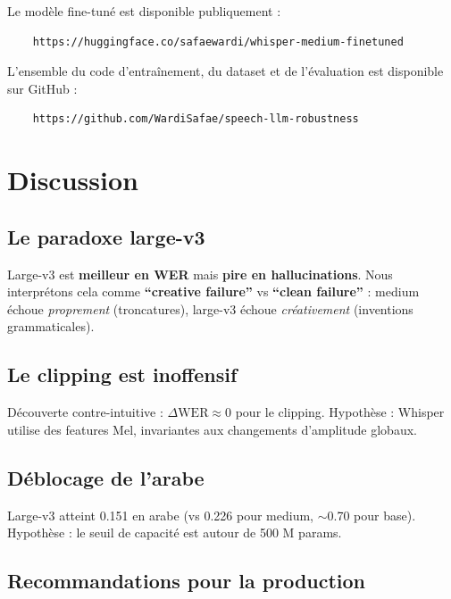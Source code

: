 \documentclass[11pt,a4paper]{article}
\begin{document}
Le modèle fine-tuné est disponible publiquement :

\begin{verbatim}
	https://huggingface.co/safaewardi/whisper-medium-finetuned
\end{verbatim}

L'ensemble du code d'entraînement, du dataset et de l'évaluation est
disponible sur GitHub :

\begin{verbatim}
	https://github.com/WardiSafae/speech-llm-robustness
\end{verbatim}

\section{Discussion}
\label{sec:discussion}

\subsection{Le paradoxe large-v3}

Large-v3 est \textbf{meilleur en WER} mais \textbf{pire en hallucinations}.
Nous interprétons cela comme \textbf{``creative failure''} vs
\textbf{``clean failure''} : medium échoue \textit{proprement} (troncatures),
large-v3 échoue \textit{créativement} (inventions grammaticales).

\subsection{Le clipping est inoffensif}

Découverte contre-intuitive : $\Delta \text{WER} \approx 0$ pour le clipping.
Hypothèse : Whisper utilise des features Mel, invariantes aux changements
d'amplitude globaux.

\subsection{Déblocage de l'arabe}

Large-v3 atteint 0.151 en arabe (vs 0.226 pour medium, $\sim$0.70 pour base).
Hypothèse : le seuil de capacité est autour de 500 M params.

\subsection{Recommandations pour la production}
\end{document}
